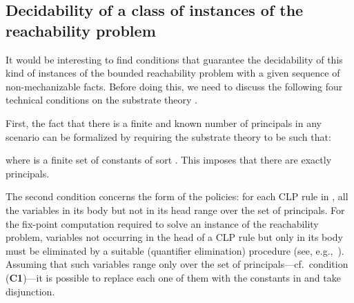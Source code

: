 \documentclass[conference]{llncs}
\begin{document}
\subsection{Decidability of a class of instances of the reachability problem}
 It would be interesting to find conditions that guarantee the
decidability of this kind of instances of the bounded reachability
problem with a given sequence of non-mechanizable facts. Before doing
this, we need to discuss the following four technical conditions on the
substrate theory .

First, 
the fact that there is a finite and known number of principals
in any scenario can be formalized by requiring the substrate theory
 to be such that: 


where  is a finite set of constants of sort . 
This imposes that there are exactly  principals. 

The second condition
concerns the form of the policies:  {for each CLP rule in
, all the variables in its body but not in its head range
over the set  of principals.} 
For the fix-point computation required to solve an instance of the
reachability problem, variables not occurring in the head of a CLP
rule but only in its body must be eliminated by a suitable (quantifier
elimination) procedure (see, e.g.,~\cite{constraintdatalog}).
Assuming that such variables range only over the set  of
principals---cf.~condition (\textbf{C1})---it is possible to replace
each one of them with the constants in  and take disjunction.
\end{document}
